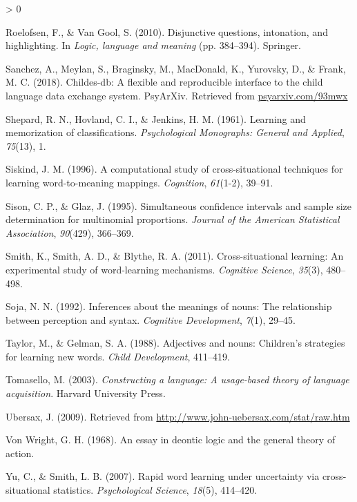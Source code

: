 \documentclass[
  english,
  ,man,floatsintext]{apa6}
\newlength{\cslhangindent}
\newenvironment{CSLReferences}[2] %
 {%
  \setlength{\parindent}{0pt}
  \ifodd #1 \everypar{\setlength{\hangindent}{\cslhangindent}}\ignorespaces\fi
  \ifnum #2 > 0
  \setlength{\parskip}{#2\baselineskip}
  \fi
 }%
 {}
\begin{document}
\begin{CSLReferences}{1}{0}
\leavevmode\hypertarget{ref-roelofsen2010disjunctive}{}%
Roelofsen, F., \& Van Gool, S. (2010). Disjunctive questions, intonation, and highlighting. In \emph{Logic, language and meaning} (pp. 384--394). Springer.

\leavevmode\hypertarget{ref-sanchez2018childes}{}%
Sanchez, A., Meylan, S., Braginsky, M., MacDonald, K., Yurovsky, D., \& Frank, M. C. (2018). Childes-db: A flexible and reproducible interface to the child language data exchange system. PsyArXiv. Retrieved from \href{https://psyarxiv.com/93mwx}{psyarxiv.com/93mwx}

\leavevmode\hypertarget{ref-shepard1961learning}{}%
Shepard, R. N., Hovland, C. I., \& Jenkins, H. M. (1961). Learning and memorization of classifications. \emph{Psychological Monographs: General and Applied}, \emph{75}(13), 1.

\leavevmode\hypertarget{ref-siskind1996computational}{}%
Siskind, J. M. (1996). A computational study of cross-situational techniques for learning word-to-meaning mappings. \emph{Cognition}, \emph{61}(1-2), 39--91.

\leavevmode\hypertarget{ref-sison1995simultaneous}{}%
Sison, C. P., \& Glaz, J. (1995). Simultaneous confidence intervals and sample size determination for multinomial proportions. \emph{Journal of the American Statistical Association}, \emph{90}(429), 366--369.

\leavevmode\hypertarget{ref-smith2011cross}{}%
Smith, K., Smith, A. D., \& Blythe, R. A. (2011). Cross-situational learning: An experimental study of word-learning mechanisms. \emph{Cognitive Science}, \emph{35}(3), 480--498.

\leavevmode\hypertarget{ref-soja1992inferences}{}%
Soja, N. N. (1992). Inferences about the meanings of nouns: The relationship between perception and syntax. \emph{Cognitive Development}, \emph{7}(1), 29--45.

\leavevmode\hypertarget{ref-taylor1988adjectives}{}%
Taylor, M., \& Gelman, S. A. (1988). Adjectives and nouns: Children's strategies for learning new words. \emph{Child Development}, 411--419.

\leavevmode\hypertarget{ref-tomasello2003constructing}{}%
Tomasello, M. (2003). \emph{Constructing a language: A usage-based theory of language acquisition}. Harvard University Press.

\leavevmode\hypertarget{ref-ubersax2009}{}%
Ubersax, J. (2009). Retrieved from \url{http://www.john-uebersax.com/stat/raw.htm}

\leavevmode\hypertarget{ref-von1968essay}{}%
Von Wright, G. H. (1968). An essay in deontic logic and the general theory of action.

\leavevmode\hypertarget{ref-yu2007rapid}{}%
Yu, C., \& Smith, L. B. (2007). Rapid word learning under uncertainty via cross-situational statistics. \emph{Psychological Science}, \emph{18}(5), 414--420.

\end{CSLReferences}
\end{document}
